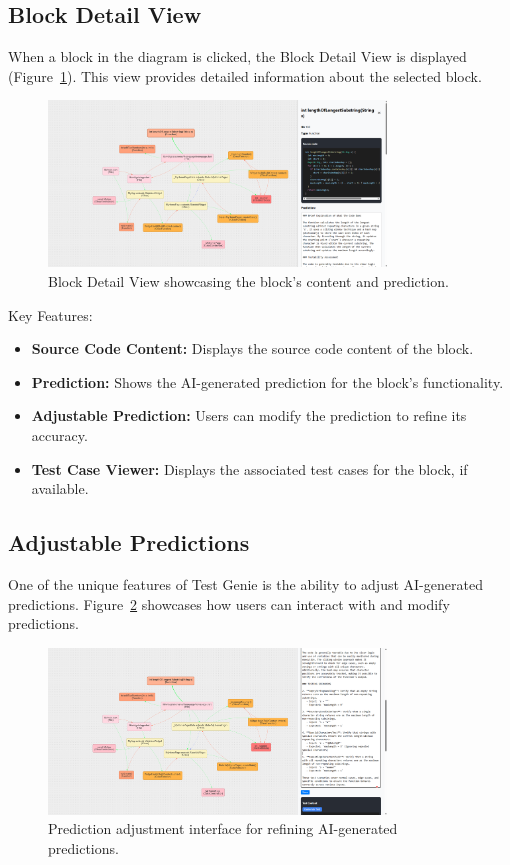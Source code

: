 \subsection{Block Detail View}

When a block in the diagram is clicked, the Block Detail View is displayed (Figure~\ref{fig:block-detail}). This view provides detailed information about the selected block.

\begin{figure}[H]
    \centering
    \includegraphics[width=0.8\textwidth]{images/block_detail.png}
    \caption{Block Detail View showcasing the block's content and prediction.}
    \label{fig:block-detail}
\end{figure}

Key Features:
\begin{itemize}
    \item \textbf{Source Code Content:} Displays the source code content of the block.
    \item \textbf{Prediction:} Shows the AI-generated prediction for the block's functionality.
    \item \textbf{Adjustable Prediction:} Users can modify the prediction to refine its accuracy.
    \item \textbf{Test Case Viewer:} Displays the associated test cases for the block, if available.
\end{itemize}

\subsection{Adjustable Predictions}

One of the unique features of Test Genie is the ability to adjust AI-generated predictions. Figure~\ref{fig:prediction-adjustable} showcases how users can interact with and modify predictions.

\begin{figure}[H]
    \centering
    \includegraphics[width=0.8\textwidth]{images/prediction-adjustable.png}
    \caption{Prediction adjustment interface for refining AI-generated predictions.}
    \label{fig:prediction-adjustable}
\end{figure}

